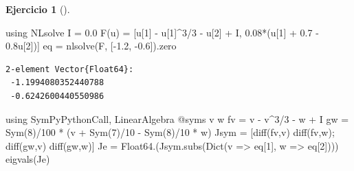 \documentclass[
  spanish,
  a4paper,
]{scrreport}
\newenvironment{Shaded}{\begin{snugshade}}{\end{snugshade}}
\newcommand{\BuiltInTok}[1]{\textcolor[rgb]{0.00,0.23,0.31}{#1}}
\newcommand{\FloatTok}[1]{\textcolor[rgb]{0.68,0.00,0.00}{#1}}
\newcommand{\FunctionTok}[1]{\textcolor[rgb]{0.28,0.35,0.67}{#1}}
\newcommand{\ImportTok}[1]{\textcolor[rgb]{0.00,0.46,0.62}{#1}}
\newcommand{\NormalTok}[1]{\textcolor[rgb]{0.00,0.23,0.31}{#1}}
\newcommand{\OperatorTok}[1]{\textcolor[rgb]{0.37,0.37,0.37}{#1}}
\newcommand{\PreprocessorTok}[1]{\textcolor[rgb]{0.68,0.00,0.00}{#1}}
\theoremstyle{definition}
\newtheorem{exercise}{Ejercicio}[chapter]
\theoremstyle{remark}
\begin{document}
\begin{exercise}[]
\begin{enumerate}
\begin{tcolorbox}
\begin{Shaded}
\begin{Highlighting}[]
\ImportTok{using} \BuiltInTok{NLsolve}
\NormalTok{I }\OperatorTok{=} \FloatTok{0.0}
\FunctionTok{F}\NormalTok{(u) }\OperatorTok{=}\NormalTok{ [u[}\FloatTok{1}\NormalTok{] }\OperatorTok{{-}}\NormalTok{ u[}\FloatTok{1}\NormalTok{]}\OperatorTok{\^{}}\FloatTok{3}\OperatorTok{/}\FloatTok{3} \OperatorTok{{-}}\NormalTok{ u[}\FloatTok{2}\NormalTok{] }\OperatorTok{+}\NormalTok{ I, }\FloatTok{0.08}\FunctionTok{*}\NormalTok{(u[}\FloatTok{1}\NormalTok{] }\OperatorTok{+} \FloatTok{0.7} \OperatorTok{{-}} \FloatTok{0.8}\NormalTok{u[}\FloatTok{2}\NormalTok{])]}
\NormalTok{eq }\OperatorTok{=} \FunctionTok{nlsolve}\NormalTok{(F, [}\OperatorTok{{-}}\FloatTok{1.2}\NormalTok{, }\OperatorTok{{-}}\FloatTok{0.6}\NormalTok{]).zero}
\end{Highlighting}
\end{Shaded}

\begin{verbatim}
2-element Vector{Float64}:
 -1.1994080352440788
 -0.6242600440550986
\end{verbatim}

\begin{Shaded}
\begin{Highlighting}[]
\ImportTok{using} \BuiltInTok{SymPyPythonCall}\NormalTok{, }\BuiltInTok{LinearAlgebra}
\PreprocessorTok{@syms}\NormalTok{ v w}
\NormalTok{fv }\OperatorTok{=}\NormalTok{ v }\OperatorTok{{-}}\NormalTok{ v}\OperatorTok{\^{}}\FloatTok{3}\OperatorTok{/}\FloatTok{3} \OperatorTok{{-}}\NormalTok{ w }\OperatorTok{+}\NormalTok{ I}
\NormalTok{gw }\OperatorTok{=} \FunctionTok{Sym}\NormalTok{(}\FloatTok{8}\NormalTok{)}\OperatorTok{/}\FloatTok{100} \OperatorTok{*}\NormalTok{ (v }\OperatorTok{+} \FunctionTok{Sym}\NormalTok{(}\FloatTok{7}\NormalTok{)}\OperatorTok{/}\FloatTok{10} \OperatorTok{{-}} \FunctionTok{Sym}\NormalTok{(}\FloatTok{8}\NormalTok{)}\OperatorTok{/}\FloatTok{10} \OperatorTok{*}\NormalTok{ w)}
\NormalTok{Jsym }\OperatorTok{=}\NormalTok{ [}\FunctionTok{diff}\NormalTok{(fv,v) }\FunctionTok{diff}\NormalTok{(fv,w); }\FunctionTok{diff}\NormalTok{(gw,v) }\FunctionTok{diff}\NormalTok{(gw,w)]}
\NormalTok{Je }\OperatorTok{=} \FunctionTok{Float64}\NormalTok{.(Jsym.}\FunctionTok{subs}\NormalTok{(}\FunctionTok{Dict}\NormalTok{(v }\OperatorTok{=\textgreater{}}\NormalTok{ eq[}\FloatTok{1}\NormalTok{], w }\OperatorTok{=\textgreater{}}\NormalTok{ eq[}\FloatTok{2}\NormalTok{])))}
\FunctionTok{eigvals}\NormalTok{(Je)}
\end{Highlighting}
\end{Shaded}


\end{tcolorbox}
\end{enumerate}
\end{exercise}
\end{document}
